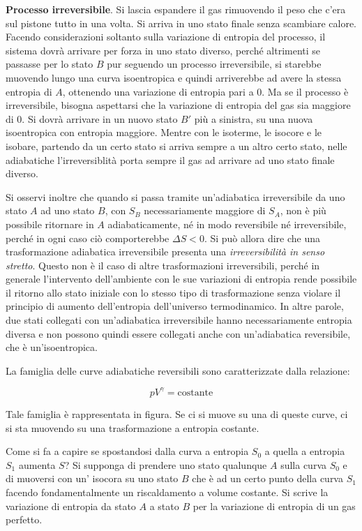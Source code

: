 \textbf{Processo irreversibile}. Si lascia espandere il gas rimuovendo il peso che c'era sul pistone tutto in una volta. Si arriva in uno stato finale senza scambiare calore. Facendo considerazioni soltanto sulla variazione di entropia del processo, il sistema dovrà arrivare per forza in uno stato diverso, perché altrimenti se passasse per lo stato $B$ pur seguendo un processo irreversibile, si starebbe muovendo lungo una curva isoentropica e quindi arriverebbe ad avere la stessa entropia di $A$, ottenendo una variazione di entropia pari a $0$. Ma se il processo è irreversibile, bisogna aspettarsi che la variazione di entropia del gas sia maggiore di $0$. Si dovrà arrivare in un nuovo stato $B'$ più a sinistra, su una nuova isoentropica con entropia maggiore. Mentre con le isoterme, le isocore e le isobare, partendo da un certo stato si arriva sempre a un altro certo stato, nelle adiabatiche l'irreversiblità porta sempre il gas ad arrivare ad uno stato finale diverso.

Si osservi inoltre che quando si passa tramite un'adiabatica irreversibile da uno stato $A$ ad uno stato $B$, con $S_B$ necessariamente maggiore di $S_A$, non è più possibile ritornare in $A$ adiabaticamente, né in modo reversibile né irreversibile, perché in ogni caso ciò comporterebbe $\Delta S<0$. Si può allora dire che una trasformazione adiabatica irreversibile presenta una \emph{irreversibilità in senso stretto}. Questo non è il caso di altre trasformazioni irreversibili, perché in generale l'intervento dell'ambiente con le sue variazioni di entropia rende possibile il ritorno allo stato iniziale con lo stesso tipo di trasformazione senza violare il principio di aumento dell'entropia dell'universo termodinamico.
In altre parole, due stati collegati con un'adiabatica irreversibile hanno necessariamente entropia diversa e non possono quindi essere collegati anche con un'adiabatica reversibile, che è un'isoentropica.

La famiglia delle curve adiabatiche reversibili sono caratterizzate dalla relazione:

\[
	pV^{\gamma } = \text{costante}
\]

Tale famiglia è rappresentata in figura. Se ci si muove su una di queste curve, ci si sta muovendo su una trasformazione a entropia costante.

Come si fa a capire se spostandosi dalla curva a entropia $S_0$ a quella a entropia $S_1$ aumenta $S$?
Si supponga di prendere uno stato qualunque $A$ sulla curva $S_0$ e di muoversi con un' isocora su uno stato $B$ che è ad un certo punto della curva $S_1$ facendo fondamentalmente un riscaldamento a volume costante. Si scrive la variazione di entropia da stato $A$ a stato $B$ per la variazione di entropia di un gas perfetto.


